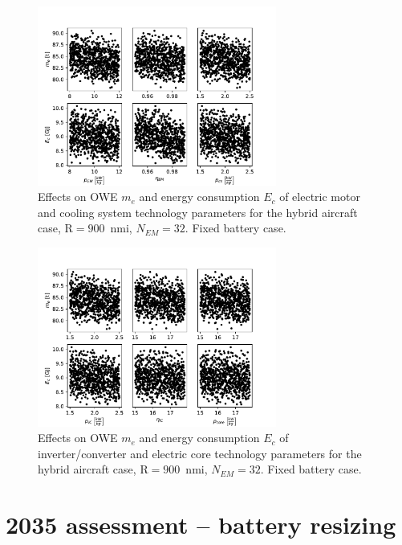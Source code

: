 \begin{figure}[h!]
	\centering
	\includegraphics[keepaspectratio, width=0.7\textwidth]{images/app_sens_plot/techno_sensitivity_em_cs}
	\caption{Effects on OWE $m_e$ and energy consumption $E_c$ of electric motor and cooling system technology parameters for the hybrid aircraft case, $\textrm{R}=900$~nmi, $N_{EM}=32$. Fixed battery case.}
	\label{fig:sens_an_em_cs}
\end{figure}
\begin{figure}[h!]
	\centering
	\includegraphics[keepaspectratio, width=0.7\textwidth]{images/app_sens_plot/techno_sensitivity_ic_core}
	\caption{Effects on OWE $m_e$ and energy consumption $E_c$ of inverter/converter and electric core technology parameters for the hybrid aircraft case, $\textrm{R}=900$~nmi, $N_{EM}=32$. Fixed battery case.}
	\label{fig:sens_an_ic_core}
\end{figure}

\clearpage

\section{2035 assessment -- battery resizing}
\label{sec:app_sens_an_plot_techno_batt_res}

